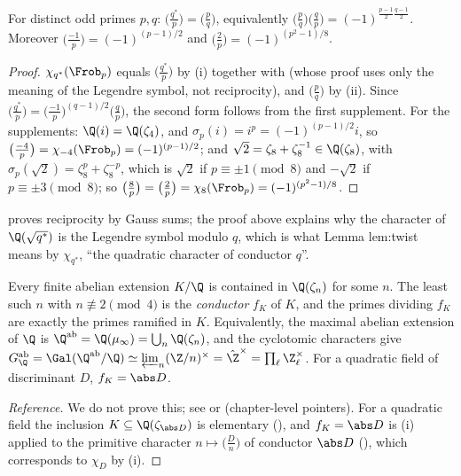 \begin{corollary}\label{cor:ant:qr}
For distinct odd primes $p,q$: $\bigl(\frac{q^*}p\bigr)=\bigl(\frac pq\bigr)$, equivalently $\bigl(\frac pq\bigr)\bigl(\frac qp\bigr)=(-1)^{\frac{p-1}2\frac{q-1}2}$. Moreover
$\bigl(\frac{-1}p\bigr)=(-1)^{(p-1)/2}$ and $\bigl(\frac2p\bigr)=(-1)^{(p^2-1)/8}$.
\end{corollary}

\begin{proof}
$\chi_{q^*}(\Frob_p)$ equals $\bigl(\frac{q^*}p\bigr)$ by (i) together with  (whose proof uses only the meaning of the
Legendre symbol, not reciprocity), and $\bigl(\frac pq\bigr)$ by (ii). Since $\bigl(\frac{q^*}p\bigr)=\bigl(\frac{-1}p\bigr)^{(q-1)/2}\bigl(\frac qp\bigr)$,
the second form follows from the first supplement. For the supplements: $\Q(i)=\Q(\zeta_4)$, and $\sigma_p(i)=i^p=(-1)^{(p-1)/2}i$, so $\bigl(\frac{-4}p\bigr)=
\chi_{-4}(\Frob_p)=(-1)^{(p-1)/2}$; and $\sqrt2=\zeta_8+\zeta_8^{-1}\in\Q(\zeta_8)$, with $\sigma_p(\sqrt2)=\zeta_8^p+\zeta_8^{-p}$, which is $\sqrt2$ if $p\equiv\pm1\pmod8$
and $-\sqrt2$ if $p\equiv\pm3\pmod8$; so $\bigl(\frac8p\bigr)=\bigl(\frac2p\bigr)=\chi_8(\Frob_p)=(-1)^{(p^2-1)/8}$.
\end{proof}

 proves reciprocity by Gauss sums; the proof above explains why the character of $\Q(\sqrt{q^*})$ is the Legendre symbol modulo $q$, which is
what Lemma lem:twist means by $\chi_{q^*}$, ``the quadratic character of conductor $q$''.

\begin{theorem}\label{thm:ant:kroneckerweber}
Every finite abelian extension $K/\Q$ is contained in $\Q(\zeta_n)$ for some $n$. The least such $n$ with $n\not\equiv2\pmod4$ is the \emph{conductor} $f_K$
of $K$, and the primes dividing $f_K$ are exactly the primes ramified in $K$. Equivalently, the maximal abelian extension of $\Q$ is
$\Q^{\mathrm{ab}}=\Q(\mu_\infty)=\bigcup_n\Q(\zeta_n)$, and the cyclotomic characters give $G_\Q^{\mathrm{ab}}=\Gal(\Q^{\mathrm{ab}}/\Q)\simeq\varprojlim_n(\Z/n)^\times=
\hat\Z^\times=\prod_\ell\Z_\ell^\times$. For a quadratic field of discriminant $D$, $f_K=\abs D$.
\end{theorem}

\begin{proof}[Reference]
We do not prove this; see \cite[Chapter 14]{Washington} or \cite[Chapter V, Section 1, and Chapter VI]{Neukirch} (chapter-level pointers). For a
quadratic field the inclusion $K\subseteq\Q(\zeta_{\abs D})$ is elementary (), and $f_K=\abs D$ is (i) applied to
the primitive character $n\mapsto\bigl(\frac Dn\bigr)$ of conductor $\abs D$ (), which corresponds to $\chi_D$ by (i).
\end{proof}

